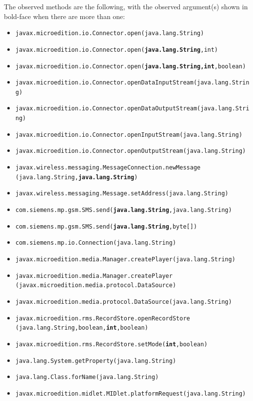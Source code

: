 The observed methods are the following, with the observed argument(s)
shown in bold-face when there are more than one:

\begin{itemize}
\item \texttt{javax.microedition.io.Connector.open(java.lang.String)}
\item \texttt{javax.microedition.io.Connector.open(\textbf{java.lang.String},int)}
\item \texttt{javax.microedition.io.Connector.open(\textbf{java.lang.String,int},boolean)}
\item \texttt{javax.microedition.io.Connector.openDataInputStream(java.lang.String)}
\item \texttt{javax.microedition.io.Connector.openDataOutputStream(java.lang.String)}
\item \texttt{javax.microedition.io.Connector.openInputStream(java.lang.String)}
\item \texttt{javax.microedition.io.Connector.openOutputStream(java.lang.String)}
\item \texttt{javax.wireless.messaging.MessageConnection.newMessage\\ \mbox{} \hspace{1cm} (java.lang.String,\textbf{java.lang.String})}
\item \texttt{javax.wireless.messaging.Message.setAddress(java.lang.String)}
\item \texttt{com.siemens.mp.gsm.SMS.send(\textbf{java.lang.String},java.lang.String)}
\item \texttt{com.siemens.mp.gsm.SMS.send(\textbf{java.lang.String},byte[])}
\item \texttt{com.siemens.mp.io.Connection(java.lang.String)}
\item \texttt{javax.microedition.media.Manager.createPlayer(java.lang.String)}
\item \texttt{javax.microedition.media.Manager.createPlayer\\ \mbox{} \hspace{1cm} (javax.microedition.media.protocol.DataSource)}
\item \texttt{javax.microedition.media.protocol.DataSource(java.lang.String)}
\item \texttt{javax.microedition.rms.RecordStore.openRecordStore\\ \mbox{} \hspace{1cm} (java.lang.String,boolean,\textbf{int},boolean)}
\item \texttt{javax.microedition.rms.RecordStore.setMode(\textbf{int},boolean)}
\item \texttt{java.lang.System.getProperty(java.lang.String)}
\item \texttt{java.lang.Class.forName(java.lang.String)}
\item \texttt{javax.microedition.midlet.MIDlet.platformRequest(java.lang.String)}
\end{itemize}


